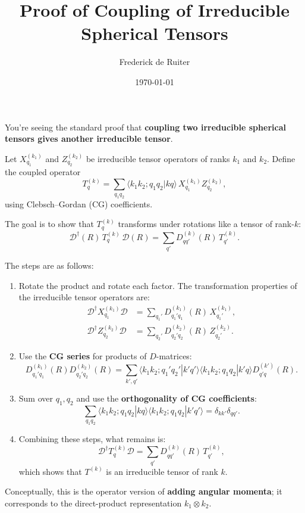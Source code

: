 \documentclass[12pt]{article}
\title{Proof of Coupling of Irreducible Spherical Tensors}
\author{Frederick de Ruiter}
\date{\today}
\begin{document}
\maketitle

You’re seeing the standard proof that \textbf{coupling two irreducible spherical tensors gives another irreducible tensor}.

Let $X^{(k_1)}_{q_1}$ and $Z^{(k_2)}_{q_2}$ be irreducible tensor operators of ranks $k_1$ and $k_2$. Define the coupled operator
\begin{equation}
T^{(k)}_q = \sum_{q_1 q_2} \langle k_1 k_2; q_1 q_2 | k q\rangle\, X^{(k_1)}_{q_1} Z^{(k_2)}_{q_2},
\end{equation}
using Clebsch–Gordan (CG) coefficients.

The goal is to show that $T^{(k)}_q$ transforms under rotations like a tensor of rank-$k$:
\begin{equation}
\mathcal D^\dagger(R)\,T^{(k)}_q\,\mathcal D(R)=\sum_{q'} D^{(k)}_{q q'}(R)\,T^{(k)}_{q'}.
\end{equation}

The steps are as follows:

\begin{enumerate}
    \item Rotate the product and rotate each factor. The transformation properties of the irreducible tensor operators are:
    \begin{align}
    \mathcal D^\dagger X^{(k_1)}_{q_1}\mathcal D &= \sum_{q_1'} D^{(k_1)}_{q_1' q_1}(R)\,X^{(k_1)}_{q_1'}, \\
    \mathcal D^\dagger Z^{(k_2)}_{q_2}\mathcal D &= \sum_{q_2'} D^{(k_2)}_{q_2' q_2}(R)\,Z^{(k_2)}_{q_2'}.
    \end{align}

    \item Use the \textbf{CG series} for products of $D$-matrices:
    \begin{equation}
    D^{(k_1)}_{q_1' q_1}(R) D^{(k_2)}_{q_2' q_2}(R)
    = \sum_{k',q'} \langle k_1 k_2; q_1' q_2'|k' q'\rangle
    \langle k_1 k_2; q_1 q_2|k' q\rangle
    D^{(k')}_{q' q}(R).
    \end{equation}

    \item Sum over $q_1,q_2$ and use the \textbf{orthogonality of CG coefficients}:
    \begin{equation}
    \sum_{q_1 q_2}\langle k_1 k_2; q_1 q_2|k q\rangle
    \langle k_1 k_2; q_1 q_2|k' q'\rangle
    =\delta_{k k'}\delta_{q q'}.
    \end{equation}

    \item Combining these steps, what remains is:
    \begin{equation}
    \mathcal D^\dagger T^{(k)}_q \mathcal D=\sum_{q'} D^{(k)}_{q q'}(R)\,T^{(k)}_{q'},
    \end{equation}
    which shows that $T^{(k)}$ is an irreducible tensor of rank $k$.
\end{enumerate}

Conceptually, this is the operator version of \textbf{adding angular momenta}; it corresponds to the direct-product representation $k_1\otimes k_2$.
\end{document}
